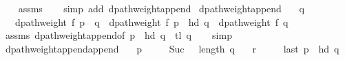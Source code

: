 \begin{isabellebody}
%
\isadelimproof
\ \ %
\endisadelimproof
%
\isatagproof
{}\isamarkupfalse%
\ assms\isanewline
\ \ \isamarkupfalse%
\ {\isacharparenleft}{\kern0pt}simp\ add{\isacharcolon}{\kern0pt}\ dpath{\isacharunderscore}{\kern0pt}weight{\isacharunderscore}{\kern0pt}append{\isacharparenright}{\kern0pt}%
\endisatagproof
{\isafoldproof}%
%
\isadelimproof
\isanewline
%
\endisadelimproof
\isanewline
{}\isamarkupfalse%
\ dpath{\isacharunderscore}{\kern0pt}weight{\isacharunderscore}{\kern0pt}append{\isacharunderscore}{\kern0pt}{}{\isacharcolon}{\kern0pt}\isanewline
\ \ \ {\isachardoublequoteopen}q\ {\isasymnoteq}\ {\isacharbrackleft}{\kern0pt}{\isacharbrackright}{\kern0pt}{\isachardoublequoteclose}\isanewline
\ \ \ {\isachardoublequoteopen}dpath{\isacharunderscore}{\kern0pt}weight\ f\ {\isacharparenleft}{\kern0pt}p\ {\isacharat}{\kern0pt}\ q{\isacharparenright}{\kern0pt}\ {\isacharequal}{\kern0pt}\ dpath{\isacharunderscore}{\kern0pt}weight\ f\ {\isacharparenleft}{\kern0pt}p\ {\isacharat}{\kern0pt}\ {\isacharbrackleft}{\kern0pt}hd\ q{\isacharbrackright}{\kern0pt}{\isacharparenright}{\kern0pt}\ {\isacharplus}{\kern0pt}\ dpath{\isacharunderscore}{\kern0pt}weight\ f\ q{\isachardoublequoteclose}\isanewline
%
\isadelimproof
\ \ %
\endisadelimproof
%
\isatagproof
{}\isamarkupfalse%
\ assms\ dpath{\isacharunderscore}{\kern0pt}weight{\isacharunderscore}{\kern0pt}append{\isacharbrackleft}{\kern0pt}of\ {\isachardoublequoteopen}p\ {\isacharat}{\kern0pt}\ {\isacharbrackleft}{\kern0pt}hd\ q{\isacharbrackright}{\kern0pt}{\isachardoublequoteclose}\ {\isacharunderscore}{\kern0pt}\ {\isachardoublequoteopen}tl\ q{\isachardoublequoteclose}{\isacharbrackright}{\kern0pt}\isanewline
\ \ \isamarkupfalse%
\ simp%
\endisatagproof
{\isafoldproof}%
%
\isadelimproof
\isanewline
%
\endisadelimproof
\isanewline
{}\isamarkupfalse%
\ dpath{\isacharunderscore}{\kern0pt}weight{\isacharunderscore}{\kern0pt}append{\isacharunderscore}{\kern0pt}append{\isacharcolon}{\kern0pt}\isanewline
\ \ \ {\isachardoublequoteopen}p\ {\isasymnoteq}\ {\isacharbrackleft}{\kern0pt}{\isacharbrackright}{\kern0pt}{\isachardoublequoteclose}\isanewline
\ \ \ {\isachardoublequoteopen}Suc\ {}\ {\isacharless}{\kern0pt}\ length\ q{\isachardoublequoteclose}\isanewline
\ \ \ {\isachardoublequoteopen}r\ {\isasymnoteq}\ {\isacharbrackleft}{\kern0pt}{\isacharbrackright}{\kern0pt}{\isachardoublequoteclose}\isanewline
\ \ \ {\isachardoublequoteopen}last\ p\ {\isacharequal}{\kern0pt}\ hd\ q{\isachardoublequoteclose}\isanewline

\end{isabellebody}
